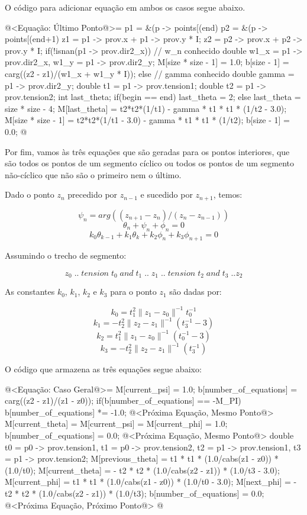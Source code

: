 O código para adicionar equação em ambos os casos segue abaixo.

\iniciocodigo
@<Equação: Último Ponto@>=
p1 = &(p -> points[(end) %
p2 = &(p -> points[(end+1) %
z1 = p1 -> prov.x + p1 -> prov.y * I;
z2 = p2 -> prov.x + p2 -> prov.y * I;
if(!isnan(p1 -> prov.dir2_x)){ // w_n conhecido
  double w1_x = p1 -> prov.dir2_x, w1_y = p1 -> prov.dir2_y;
  M[size * size - 1] = 1.0;
  b[size - 1] = carg((z2 - z1)/(w1_x + w1_y * I));
}
else{ // gamma conhecido
  double gamma = p1 -> prov.dir2_y;
  double t1 = p1 -> prov.tension1;
  double t2 = p1 -> prov.tension2;
  int last_theta;
  if(begin == end)
    last_theta = 2;
  else
    last_theta = size * size - 4;
  M[last_theta] = t2*t2*(1/t1) - gamma * t1 * t1 * (1/t2 - 3.0);
  M[size * size - 1] = t2*t2*(1/t1 - 3.0) - gamma * t1 * t1 * (1/t2);
  b[size - 1] = 0.0;
}
@
\fimcodigo

Por fim, vamos às três equações que são geradas para os pontos
interiores, que são todos os pontos de um segmento cíclico ou todos os
pontos de um segmento não-cíclico que não são o primeiro nem o último.

Dado o ponto $z_n$ precedido por $z_{n-1}$ e sucedido por $z_{n+1}$,
temos:

$$
\psi_n = arg((z_{n+1}-z_n)/(z_n-z_{n-1}))
$$
$$
\theta_n + \psi_n + \phi_n = 0
$$
$$
k_0\theta_{k-1} + k_1\theta_k + k_2\phi_n + k_3\phi_{n+1} = 0
$$

Assumindo o trecho de segmento:

$$
z_0\; ..\; tension\; t_0\; and\; t_1\; ..\; z_1\; ..\; tension\; t_2\; and\; t_3
\; .. z_2
$$

As constantes $k_0$, $k_1$, $k_2$ e $k_3$ para o ponto $z_1$ são dadas por:

$$
k_0 = t_1^2\|z_1-z_0\|^{-1}t_0^{-1}
$$
$$
k_1 = - t_2^2\|z_2-z_1\|^{-1}(t_3^{-1}-3)
$$
$$
k_2 = t_1^2\|z_1-z_0\|^{-1}(t_0^{-1} - 3)
$$
$$
k_3 = - t_2^2\|z_2-z_1\|^{-1}(t_3^{-1})
$$

O código que armazena as três equações segue abaixo:

\iniciocodigo
@<Equação: Caso Geral@>=
M[current_psi] = 1.0;
b[number_of_equations] = carg((z2 - z1)/(z1 - z0));
if(b[number_of_equations] == -M_PI)
  b[number_of_equations] *= -1.0;
@<Próxima Equação, Mesmo Ponto@>
M[current_theta] = M[current_psi] = M[current_phi] = 1.0;
b[number_of_equations] = 0.0;
@<Próxima Equação, Mesmo Ponto@>
{
  double t0 = p0 -> prov.tension1, t1 = p0 -> prov.tension2,
         t2 = p1 -> prov.tension1, t3 = p1 -> prov.tension2;
  M[previous_theta] = t1 * t1 * (1.0/cabs(z1 - z0)) * (1.0/t0);
  M[current_theta] = - t2 * t2 * (1.0/cabs(z2 - z1)) * (1.0/t3 - 3.0);
  M[current_phi] = t1 * t1 * (1.0/cabs(z1 - z0)) * (1.0/t0 - 3.0);
  M[next_phi] = - t2 * t2 * (1.0/cabs(z2 - z1)) * (1.0/t3);
  b[number_of_equations] = 0.0;
  @<Próxima Equação, Próximo Ponto@>
}
@
\fimcodigo

